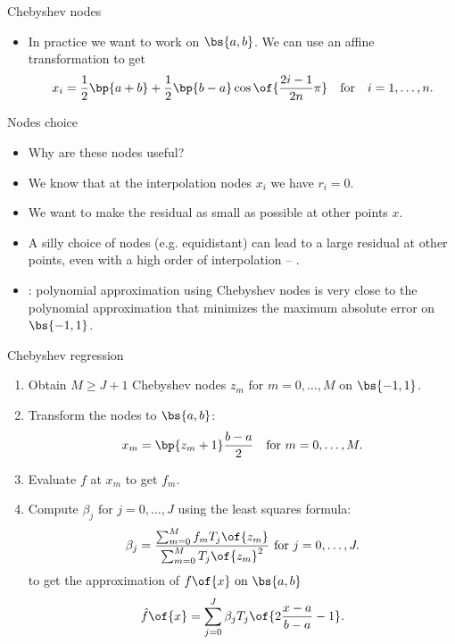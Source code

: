 \documentclass[11pt,xcolor={dvipsnames},aspectratio=159,hyperref={pdftex,pdfpagemode=UseNone,hidelinks,pdfdisplaydoctitle=true},usepdftitle=false]{beamer}
\begin{document}
\begin{frame}{Chebyshev nodes}
    \begin{itemize}
        \item In practice we want to work on $\bs{a,b}$. We can use an affine transformation to get
        \begin{align*}
        x_i = \frac{1}{2} \bp{a+b} + \frac{1}{2} \bp{b-a} \cos\of{\frac{2i-1}{2n}\pi} \quad \text{for} \quad i = 1,\ldots,n.
        \end{align*}
    \end{itemize}
\end{frame}

\begin{frame}{Nodes choice}
    \begin{itemize}
        \item Why are these nodes useful?
        \item We know that at the interpolation nodes $x_i$ we have $r_i = 0$. 
        \item We want to make the residual as small as possible at other points $x$.
        \item A silly choice of nodes (e.g. equidistant) can lead to a large residual at other points, even with a high order of interpolation -- .
        \item {}: polynomial approximation using Chebyshev nodes is very close to the polynomial approximation that minimizes the maximum absolute error on $\bs{-1,1}$.
    \end{itemize}
\end{frame}



\begin{frame}{Chebyshev regression}
    \begin{enumerate}

        \item Obtain $M\geq J + 1$ Chebyshev nodes $z_m \text{ for } m = 0,\ldots,M$ on $\bs{-1,1}$.
        \item Transform the nodes to $\bs{a,b}$: \begin{align*}
            x_m = \bp{z_m + 1}\frac{b-a}{2} \quad \text{for } m = 0,\ldots,M.
        \end{align*}
        \item Evaluate $f$ at $x_m$ to get $f_m$.
        \item Compute $\beta_j \text{ for } j = 0,\ldots,J$ using the least squares formula: 
        \begin{align*}
            \beta_j = \frac{\sum_{m=0}^M f_m T_j\of{z_m} }{\sum_{m=0}^M T_j\of{z_m}^2} \ \text{for } j = 0,\ldots,J.
        \end{align*}
        to get the approximation of $f\of{x} \text{ on } \bs{a,b}$ \begin{align*}
            \hat{f}\of{x} = \sum_{j=0}^J \beta_j T_j\of{2\frac{x-a}{b-a}-1}.
        \end{align*}
    \end{enumerate}
\end{frame}
\end{document}
